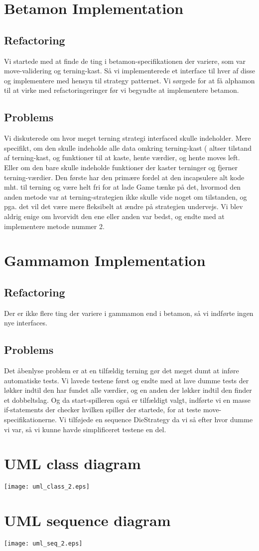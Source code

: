\documentclass[a4paper]{article}
\begin{document}
\lhead{}
\rhead{}


\section{Betamon Implementation}
\subsection{Refactoring}
Vi startede med at finde de ting i betamon-specifikationen der variere,
som var move-validering og terning-kast. Så vi implementerede et interface
til hver af disse og implementere med hensyn til strategy patternet. Vi
sørgede for at få alphamon til at virke med refactoringeringer før vi
begyndte at implementere betamon.
\subsection{Problems}
Vi diskuterede om hvor meget terning strategi interfaced skulle indeholder.
Mere specifikt, om den skulle indeholde alle data omkring terning-kast (
altser tilstand af terning-kast, og funktioner til at kaste, hente værdier,
og hente moves left. Eller om den bare skulle indeholde funktioner der
kaster terninger og fjerner terning-værdier.
Den første har den primære fordel at den incapsulere alt kode mht. til terning og
være helt fri for at lade Game tænke på det, hvormod den anden metode var
at terning-strategien ikke skulle vide noget om tilstanden, og pga. det
vil det være mere fleksibelt at ændre på strategien undervejs.
Vi blev aldrig enige om hvorvidt den ene eller anden var bedst, og endte med
at implementere metode nummer 2.

\section{Gammamon Implementation}
\subsection{Refactoring}
Der er ikke flere ting der variere i gammamon end i betamon, så vi indførte
ingen nye interfaces.
\subsection{Problems}
Det åbenlyse problem er at en tilfældig terning gør det meget dumt at 
inføre automatiske tests. Vi lavede testene først og endte med at lave
dumme tests der løkker indtil den har fundet alle værdier, og en anden
der løkker indtil den finder et dobbeltslag. Og da start-spilleren også
er tilfældigt valgt, indførte vi en masse if-statements der checker hvilken
spiller der startede, for at teste move-specifikationerne.
Vi tilføjede en sequence DieStrategy da vi så efter hvor dumme vi var,
så vi kunne havde simplificeret testene en del.

\section{UML class diagram}
\texttt{[image: uml\_class\_2.eps]}

\section{UML sequence diagram}
\texttt{[image: uml\_seq\_2.eps]}
\end{document}
